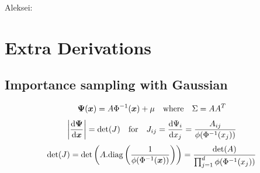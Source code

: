\documentclass[graybox,footinfo]{svmult}
\newcommand{\AGSComment}[1]{{\color{cyan} Aleksei: #1}}
\begin{document}




\iffalse
\AGSComment{

\section{Extra Derivations}

\subsection{Importance sampling with Gaussian}

$$ {\boldsymbol{\Psi}}({\boldsymbol{x}}) = A\Phi^{-1}({\boldsymbol{x}}) + \mu \quad \text{where} \quad \Sigma = AA^T$$
$$ \left\lvert \frac{\mathrm{d} {\boldsymbol{\Psi}}}{\mathrm{d} {\boldsymbol{x}}} \right\rvert = \det(J) \quad \text{for} \quad J_{ij} = \frac{\mathrm{d} \Psi_i}{\mathrm{d} x_j} = \frac{A_{ij}}{\phi(\Phi^{-1}(x_j))}$$
$$ \det(J) = \det\left(A . \text{diag}\left(\frac{1}{\phi(\Phi^{-1}({\boldsymbol{x}}))}\right)\right) = \frac{\det(A)}{\prod_{j=1}^d \phi(\Phi^{-1}(x_j))}$$}
\end{document}
